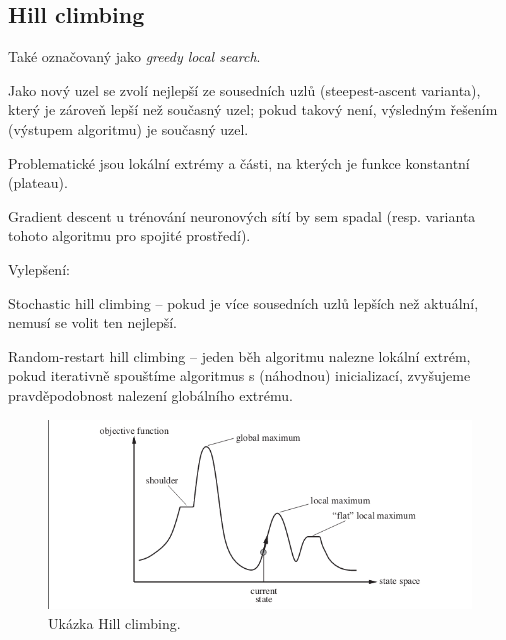 \subsection{Hill climbing}

\begin{compactitem}
    \item Také označovaný jako \textit{greedy local search}.

    \item Jako nový uzel se zvolí nejlepší ze sousedních uzlů (steepest-ascent varianta), který je zároveň lepší než současný uzel; pokud takový není, výsledným řešením (výstupem algoritmu) je současný uzel.

    \item Problematické jsou lokální extrémy a části, na kterých je funkce konstantní (plateau).

    \item Gradient descent u trénování neuronových sítí by sem spadal (resp. varianta tohoto algoritmu pro spojité prostředí).

    \item Vylepšení: \begin{compactitem}
        \item Stochastic hill climbing -- pokud je více sousedních uzlů lepších než aktuální, nemusí se volit ten nejlepší.

        \item Random-restart hill climbing -- jeden běh algoritmu nalezne lokální extrém, pokud iterativně spouštíme algoritmus s (náhodnou) inicializací, zvyšujeme pravděpodobnost nalezení globálního extrému.
    \end{compactitem}

    \begin{figure}[H]
        \centering
        \includegraphics[width=1\linewidth]{hill_climb_searching.png}
        \caption{Ukázka Hill climbing.}
    \end{figure}
\end{compactitem}

